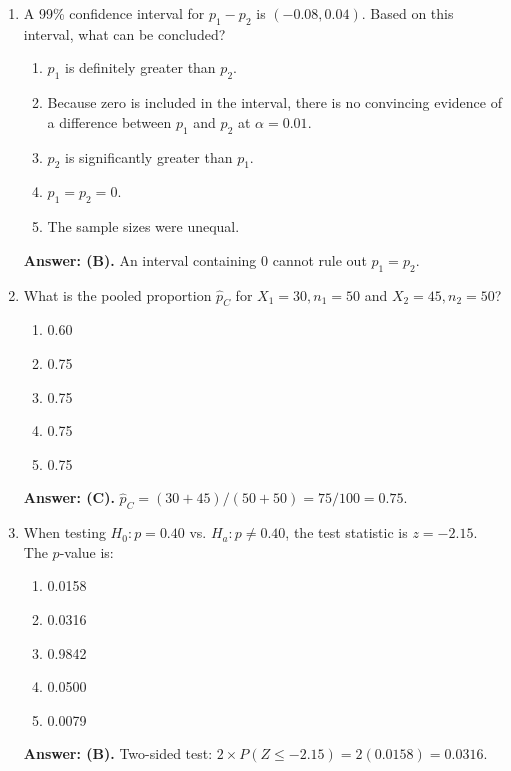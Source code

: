 \begin{enumerate}[leftmargin=1.5em]
  \item A 99\% confidence interval for $p_1 - p_2$ is $(-0.08, 0.04)$. Based on this interval, what can be concluded?
  \begin{enumerate}[label=(\Alph*)]
    \item $p_1$ is definitely greater than $p_2$.
    \item Because zero is included in the interval, there is no convincing evidence of a difference between $p_1$ and $p_2$ at $\alpha = 0.01$.
    \item $p_2$ is significantly greater than $p_1$.
    \item $p_1 = p_2 = 0$.
    \item The sample sizes were unequal.
  \end{enumerate}
  \textbf{Answer: (B).} An interval containing 0 cannot rule out $p_1 = p_2$.

  \item What is the pooled proportion $\hat{p}_C$ for $X_1 = 30, n_1 = 50$ and $X_2 = 45, n_2 = 50$?
  \begin{enumerate}[label=(\Alph*)]
    \item 0.60 \item 0.75 \item 0.75 \item 0.75 \item 0.75
  \end{enumerate}
  \textbf{Answer: (C).} $\hat{p}_C = (30 + 45)/(50 + 50) = 75/100 = 0.75$.

  \item When testing $H_0: p = 0.40$ vs. $H_a: p \neq 0.40$, the test statistic is $z = -2.15$. The $p$-value is:
  \begin{enumerate}[label=(\Alph*)]
    \item 0.0158 \item 0.0316 \item 0.9842 \item 0.0500 \item 0.0079
  \end{enumerate}
  \textbf{Answer: (B).} Two-sided test: $2 \times P(Z \le -2.15) = 2(0.0158) = 0.0316$.
\end{enumerate}

